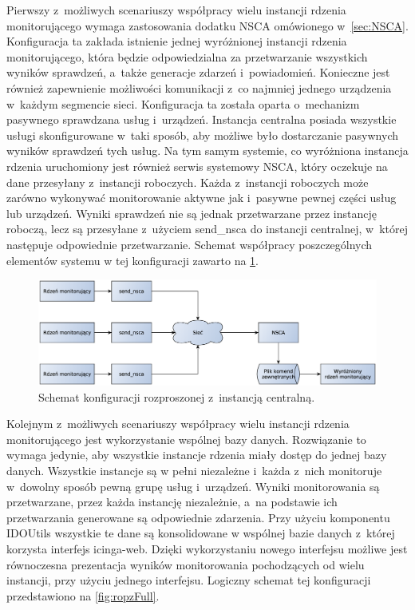 Pierwszy z~możliwych scenariuszy współpracy wielu instancji rdzenia
monitorującego wymaga zastosowania dodatku NSCA omówionego
w~\ref{sec:NSCA}. Konfiguracja ta zakłada istnienie jednej wyróżnionej
instancji rdzenia monitorującego, która będzie odpowiedzialna za
przetwarzanie wszystkich wyników sprawdzeń, a~także generacje zdarzeń
i~powiadomień. Konieczne jest również zapewnienie możliwości
komunikacji z~co najmniej jednego urządzenia w~każdym segmencie
sieci. Konfiguracja ta została oparta o~mechanizm pasywnego sprawdzana
usług i~urządzeń. Instancja centralna posiada wszystkie usługi
skonfigurowane w~taki sposób, aby możliwe było dostarczanie pasywnych
wyników sprawdzeń tych usług. Na tym samym systemie, co wyróżniona
instancja rdzenia uruchomiony jest również serwis systemowy NSCA,
który oczekuje na dane przesyłany z~instancji roboczych. Każda
z~instancji roboczych może zarówno wykonywać monitorowanie aktywne jak
i~pasywne pewnej części usług lub urządzeń. Wyniki sprawdzeń nie są
jednak przetwarzane przez instancję roboczą, lecz są przesyłane
z~użyciem send\_nsca do instancji centralnej, w~której następuje
odpowiednie przetwarzanie. Schemat współpracy poszczególnych elementów
systemu w tej konfiguracji zawarto na \ref{fig:rozpNSCA}.

\begin{figure}[h]
  \caption{Schemat konfiguracji rozproszonej z~instancją centralną.}
  \label{fig:rozpNSCA}
\includegraphics[width=1\textwidth]{img/icingaNSCA}
\end{figure}

Kolejnym z~możliwych scenariuszy współpracy wielu instancji rdzenia
monitorującego jest wykorzystanie wspólnej bazy danych. Rozwiązanie to
wymaga jedynie, aby wszystkie instancje rdzenia miały dostęp do jednej
bazy danych. Wszystkie instancje są w pełni niezależne i~każda z~nich
monitoruje w~dowolny sposób pewną grupę usług i~urządzeń. Wyniki
monitorowania są przetwarzane, przez każda instancję niezależnie, a~na
podstawie ich przetwarzania generowane są odpowiednie zdarzenia. Przy
użyciu komponentu IDOUtils wszystkie te dane są konsolidowane w
wspólnej bazie danych z~której korzysta interfejs icinga-web. Dzięki
wykorzystaniu nowego interfejsu możliwe jest równoczesna prezentacja
wyników monitorowania pochodzących od wielu instancji, przy użyciu
jednego interfejsu. Logiczny schemat tej konfiguracji przedstawiono na
\ref{fig:ropzFull}.

